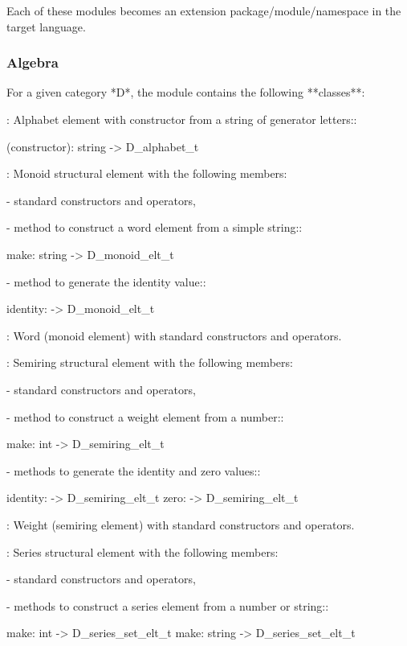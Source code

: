 Each of these modules becomes an extension package/module/namespace in
the target language.

\subsubsection{Algebra}

For  a   given  category  *D*,   the  module  
contains the following **classes**:

: 
     Alphabet element with constructor from a string of generator 
     letters::

        (constructor): string -> D\_alphabet\_t

:
     Monoid structural element with the following members:

     - standard \Vauc constructors and operators,
     
     - method to construct a word element from a simple string::

        make: string -> D\_monoid\_elt\_t

     - method to generate the identity value::

        identity: -> D\_monoid\_elt\_t 

: 
     Word  (monoid element) with  standard \Vauc  constructors and
     operators.


:
      Semiring structural element with the following members:

      - standard \Vauc constructors and operators,

      - method to construct a weight element from a number::

         make: int -> D\_semiring\_elt\_t

      - methods to generate the identity and zero values::

         identity: -> D\_semiring\_elt\_t
         zero: -> D\_semiring\_elt\_t

: 
     Weight  (semiring element)  with standard  \Vauc constructors
     and operators.

:
      Series structural element with the following members:

      - standard \Vauc constructors and operators,

      - methods to construct a series element from a number or
        string::

          make: int -> D\_series\_set\_elt\_t
          make: string -> D\_series\_set\_elt\_t

